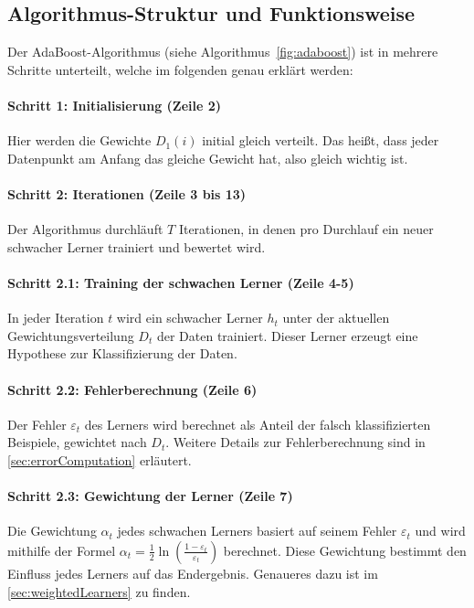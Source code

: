 \subsection{Algorithmus-Struktur und Funktionsweise}
Der AdaBoost-Algorithmus (siehe Algorithmus~\ref{fig:adaboost}) ist in mehrere Schritte unterteilt, welche im folgenden genau erklärt werden:

\paragraph{Schritt 1: Initialisierung (Zeile 2)}
Hier werden die Gewichte \( D_1(i) \) initial gleich verteilt. Das heißt, dass jeder Datenpunkt am Anfang das gleiche Gewicht hat, also gleich wichtig ist.

\paragraph{Schritt 2: Iterationen (Zeile 3 bis 13)}
Der Algorithmus durchläuft \( T \) Iterationen, in denen pro Durchlauf ein neuer schwacher Lerner trainiert und bewertet wird.

\paragraph{Schritt 2.1: Training der schwachen Lerner (Zeile 4-5)}
In jeder Iteration \( t \) wird ein schwacher Lerner \( h_t \) unter der aktuellen Gewichtungsverteilung \( D_t \) der Daten trainiert. Dieser Lerner erzeugt eine Hypothese zur Klassifizierung der Daten.

\paragraph{Schritt 2.2: Fehlerberechnung (Zeile 6)}
Der Fehler \( \varepsilon_t \) des Lerners wird berechnet als Anteil der falsch klassifizierten Beispiele, gewichtet nach \( D_t \). Weitere Details zur Fehlerberechnung sind in \autoref{sec:errorComputation} erläutert.

\paragraph{Schritt 2.3: Gewichtung der Lerner (Zeile 7)}
Die Gewichtung \( \alpha_t \) jedes schwachen Lerners basiert auf seinem Fehler \( \varepsilon_t \) und wird mithilfe der Formel \( \alpha_t = \frac{1}{2} \ln\left(\frac{1 - \varepsilon_t}{\varepsilon_t}\right) \) berechnet. Diese Gewichtung bestimmt den Einfluss jedes Lerners auf das Endergebnis. Genaueres dazu ist im \autoref{sec:weightedLearners} zu finden.

